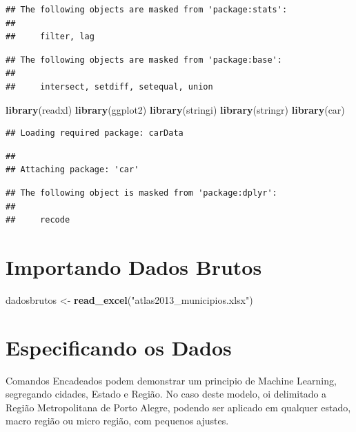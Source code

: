 \documentclass[]{article}
\newenvironment{Shaded}{\begin{snugshade}}{\end{snugshade}}
\newcommand{\KeywordTok}[1]{\textcolor[rgb]{0.13,0.29,0.53}{\textbf{#1}}}
\newcommand{\StringTok}[1]{\textcolor[rgb]{0.31,0.60,0.02}{#1}}
\newcommand{\NormalTok}[1]{#1}
\begin{document}
\begin{verbatim}
## The following objects are masked from 'package:stats':
## 
##     filter, lag
\end{verbatim}

\begin{verbatim}
## The following objects are masked from 'package:base':
## 
##     intersect, setdiff, setequal, union
\end{verbatim}

\begin{Shaded}
\begin{Highlighting}[]
\KeywordTok{library}\NormalTok{(readxl)}
\KeywordTok{library}\NormalTok{(ggplot2)}
\KeywordTok{library}\NormalTok{(stringi)}
\KeywordTok{library}\NormalTok{(stringr)}
\KeywordTok{library}\NormalTok{(car)}
\end{Highlighting}
\end{Shaded}

\begin{verbatim}
## Loading required package: carData
\end{verbatim}

\begin{verbatim}
## 
## Attaching package: 'car'
\end{verbatim}

\begin{verbatim}
## The following object is masked from 'package:dplyr':
## 
##     recode
\end{verbatim}

\section{Importando Dados Brutos}\label{importando-dados-brutos}

\begin{Shaded}
\begin{Highlighting}[]
\NormalTok{dadosbrutos <-}\StringTok{ }\KeywordTok{read_excel}\NormalTok{(}\StringTok{"atlas2013_municipios.xlsx"}\NormalTok{)}
\end{Highlighting}
\end{Shaded}

\section{Especificando os Dados}\label{especificando-os-dados}

Comandos Encadeados podem demonstrar um principio de Machine Learning,
segregando cidades, Estado e Região. No caso deste modelo, oi delimitado
a Região Metropolitana de Porto Alegre, podendo ser aplicado em qualquer
estado, macro região ou micro região, com pequenos ajustes.
\end{document}
